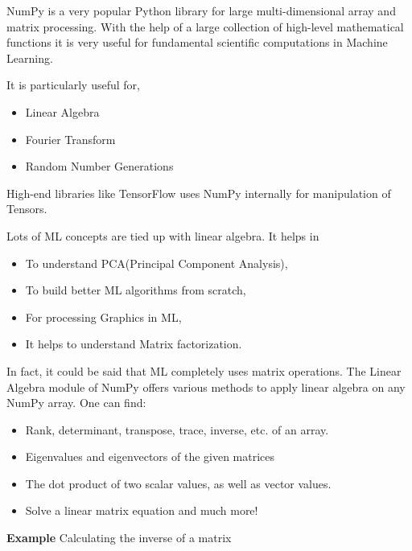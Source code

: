 \documentclass[11pt]{article}
\providecommand{\tightlist}{%
      \setlength{\itemsep}{0pt}\setlength{\parskip}{0pt}}
\begin{document}
NumPy is a very popular Python library for large multi-dimensional array
and matrix processing. With the help of a large collection of high-level
mathematical functions it is very useful for fundamental scientific
computations in Machine Learning.

It is particularly useful for,

\begin{itemize}
\tightlist
\item
  Linear Algebra
\item
  Fourier Transform
\item
  Random Number Generations
\end{itemize}

High-end libraries like TensorFlow uses NumPy internally for
manipulation of Tensors.

Lots of ML concepts are tied up with linear algebra. It helps in

\begin{itemize}
\tightlist
\item
  To understand PCA(Principal Component Analysis),
\item
  To build better ML algorithms from scratch,
\item
  For processing Graphics in ML,
\item
  It helps to understand Matrix factorization.
\end{itemize}

In fact, it could be said that ML completely uses matrix operations. The
Linear Algebra module of NumPy offers various methods to apply linear
algebra on any NumPy array. One can find:

\begin{itemize}
\tightlist
\item
  Rank, determinant, transpose, trace, inverse, etc. of an array.
\item
  Eigenvalues and eigenvectors of the given matrices
\item
  The dot product of two scalar values, as well as vector values.
\item
  Solve a linear matrix equation and much more!
\end{itemize}

    \textbf{Example} Calculating the inverse of a matrix
\end{document}
